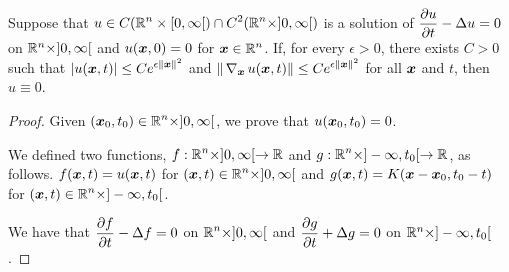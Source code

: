 \begin{prop}
Suppose that
$\displaystyle u \in C(\mathbb{R}^n \times [0,\infty[) \cap
C^2(\mathbb{R}^n \times ]0,\infty[)$
is a solution of
$\displaystyle \frac{\partial{u}}{\partial t} - \Delta u = 0$ on $\mathbb{R}^n \times ]0,\infty[$
and $u({\bm{x}},0)=0$ for $\displaystyle {\bm{x}} \in \mathbb{R}^n$.  If, for every
$\epsilon >0$, there exists $C>0$ such that
$\displaystyle |u({\bm{x}},t)| \leq C e^{\epsilon \|{\bm{x}}\|^2}$
and
$\displaystyle \|\operatorname{\nabla}_{{\bm{x}}} u({\bm{x}},t)\| \leq C e^{\epsilon \|{\bm{x}}\|^2}$
for all ${\bm{x}}$ and $t$, then $u \equiv 0$.
\end{prop}

\begin{proof}
Given $\displaystyle ({\bm{x}}_0, t_0) \in \mathbb{R}^n \times ]0,\infty[$, we
prove that $u({\bm{x}}_0,t_0) = 0$.

We defined two functions, $\displaystyle f:\mathbb{R}^n\times ]0,\infty[ \to \mathbb{R}$ and
$\displaystyle g:\mathbb{R}^n\times ]-\infty,t_0[ \to \mathbb{R}$, as follows.
$f({\bm{x}},t) = u({\bm{x}},t)$ for
$\displaystyle ({\bm{x}},t)\in \mathbb{R}^n\times ]0,\infty[$
and $g({\bm{x}},t) = K({\bm{x}}-{\bm{x}}_0, t_0-t)$ for
$\displaystyle ({\bm{x}},t)\in \mathbb{R}^n\times ]-\infty, t_0[$.

We have that $\displaystyle \frac{\partial{f}}{\partial t} - \Delta f = 0$
on $\displaystyle \mathbb{R}^n \times ]0,\infty[$ and
$\displaystyle \frac{\partial{g}}{\partial t} + \Delta g = 0$ on $\mathbb{R}^n \times ]-\infty,t_0[$.


\end{proof}
